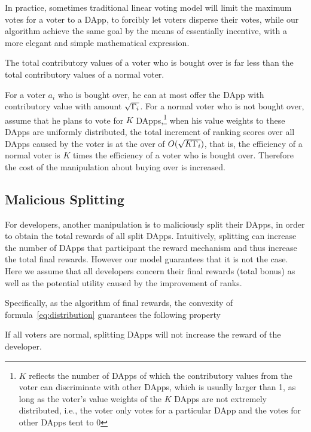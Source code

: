 In practice, sometimes traditional  linear voting model will limit the maximum votes for a voter to a DApp, to forcibly let voters disperse their votes, while our algorithm achieve the same goal by the means of essentially incentive, with a more elegant and simple mathematical expression.


\begin{corollary}
	The total contributory values of a  voter who is bought over is far less than the total contributory values of a normal voter.
\end{corollary}
For a voter $a_i$ who is bought over, he can at most offer the DApp with contributory value with amount $\sqrt{\Gamma_i}$. For a normal voter who is not bought over, assume that he plans to vote for $K$ DApps,\footnote{$K$ reflects the number of DApps of which the contributory values from the voter can discriminate with other DApps, which is usually larger than 1, as long as the voter's value weights of the $K$ DApps are not extremely distributed, i.e., the voter only votes for a particular DApp and the votes for other DApps tent to 0} when  his value weights to these DApps are uniformly distributed, the total increment of ranking scores  over all DApps caused by the voter is at the over of $O(\sqrt{K\Gamma_i})$, that is, the efficiency of a normal voter is $K$ times the efficiency of a voter who is bought over. Therefore the cost of the manipulation about buying over is increased.

\subsection{Malicious Splitting}
\label{subsec:5.2}
\noindent For developers, another manipulation is to maliciously split their DApps, in order to obtain the total rewards of all split DApps. Intuitively, splitting can increase the number of DApps that participant the reward mechanism and thus increase the total final rewards. However our model guarantees that it is not the case. Here we assume that all developers concern their final rewards (total bonus) as well as the potential utility caused by the improvement of ranks.

Specifically, as the algorithm of final rewards, the convexity of formula~\ref{eq:distribution} guarantees the following property
\begin{property}
	\label{p2}
    If all voters are normal, splitting DApps will not increase the reward of the developer.
\end{property}

